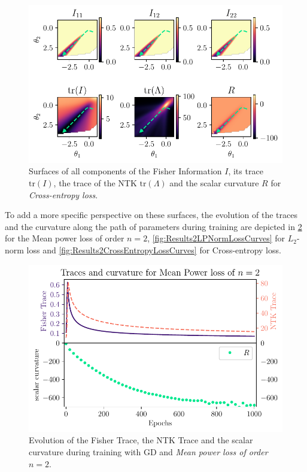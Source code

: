\begin{figure}
	\centering
	\includegraphics{Experiment2/plots/CrossEntropyLoss_tracecomparison.pdf}
	\caption{Surfaces of all components of the Fisher Information $I$, its trace $\mathrm{tr}(I)$, the trace of the NTK $\mathrm{tr}(\Lambda)$ and the scalar curvature $R$ for \emph{Cross-entropy loss}.}
	\label{fig:Results2CrossEntropyLoss}
\end{figure}
To add a more specific perspective on these surfaces, the evolution of the traces and the curvature along the path of parameters during training are depicted in \cref{fig:Results2MeanPowerLossCurves} for the Mean power loss of order $n=2$, \cref{fig:Results2LPNormLossCurves} for $L_2$-norm loss and \cref{fig:Results2CrossEntropyLossCurves} for Cross-entropy loss.\\
\begin{figure}
	\centering
	\includegraphics{Experiment2/plots/MeanPowerLoss2_Curves.pdf}
	\caption{Evolution of the Fisher Trace, the NTK Trace and the scalar curvature during training with GD and \emph{Mean power loss of order $n=2$}.}
	\label{fig:Results2MeanPowerLossCurves}
\end{figure}
